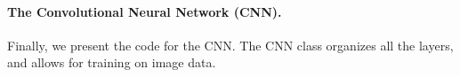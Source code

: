 \documentclass[%
oneside,                 %
final,                   %
10pt]{article}
\begin{document}
\paragraph{The Convolutional Neural Network (CNN).}
Finally, we present the code for the CNN. The CNN class organizes all the layers, and allows for training on image data.
\end{document}
